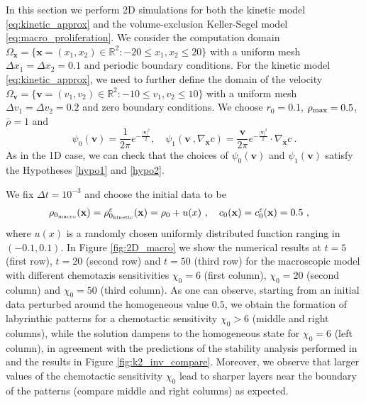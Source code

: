 \documentclass{aims} %
\theoremstyle{definition}
\begin{document}
{In this section we perform 2D simulations for both  {{the kinetic model \eqref{eq:kinetic_approx}}} and  {{the volume-exclusion Keller-Segel model \eqref{eq:macro_proliferation}}}. 
We consider the computation domain $\Omega_\mathbf{x} = \{\mathbf{x} = (x_1,x_2)\in\mathbb{R}^2: -20\le x_1, x_2 \le 20\}$ with a uniform mesh $\Delta x_1 = \Delta x_2 = 0.1$ and periodic boundary conditions.  
For the kinetic model \eqref{eq:kinetic_approx}, we need to further define the domain of the velocity $\Omega_\mathbf{v} = \{\mathbf{v} = (v_1,v_2)\in\mathbb{R}^2: -10\le v_1, v_2 \le 10\}$ with a uniform mesh $\Delta v_1 = \Delta v_2 = 0.2$ and zero boundary conditions. 
We choose $r_0=0.1$, $\rho_{\rm max} = 0.5$, $\bar{\rho} = 1$ and 
\begin{equation*}
    \psi_0(\mathbf{v}) = \frac{1}{2\pi} e^{-\frac{|\mathbf{v}|^2}{2}}, \quad \psi_1(\mathbf{v}\ , \nabla_\mathbf{x} c) = \frac{\mathbf{v}}{2\pi} e^{-\frac{|\mathbf{v}|^2}{2}}\cdot \nabla_\mathbf{x} c\ .
\end{equation*}
As in the 1D case, we can check that the choices of $\psi_0(\mathbf{v})$ and $\psi_1(\mathbf{v})$ satisfy the Hypotheses \ref{hypo1} and \ref{hypo2}.


We fix $\Delta t = 10^{-3}$ and choose the initial data to be
\begin{align*}
	&\rho_{0_\textnormal{macro}}(\mathbf{x}) =  \rho_{0_\textnormal{kinetic}}^\varepsilon(\mathbf{x}) =  \rho_0 + u(x)\ , \quad c_0(\mathbf{x}) = c_0^\varepsilon(\mathbf{x}) = 0.5\ , %
\end{align*}
where $u(x)$ is a randomly chosen uniformly distributed function ranging in $(-0.1, 0.1)$. 
In Figure \ref{fig:2D_macro} we show the numerical results at $t=5$ (first row), $t=20$ (second row) and $t=50$ (third row) for the macroscopic model with different chemotaxis sensitivities $\chi_0=6$ (first column), $\chi_0=20$ (second column) and $\chi_0=50$ (third column). As one can observe, starting from an initial data perturbed around the homogeneous value $0.5$, we obtain the formation of labyrinthic patterns for a chemotactic sensitivity $\chi_0>6$ (middle and right columns), while the solution dampens to the homogeneous state for $\chi_0=6$ (left column), in agreement with the predictions of the stability analysis performed in \cite{almeida2020treatment} and the results in Figure \ref{fig:k2_inv_compare}. Moreover, we observe that larger values of the chemotactic sensitivity $\chi_0$ {lead} to sharper layers near the boundary of the patterns (compare middle and right columns) as expected. 

}
\end{document}
